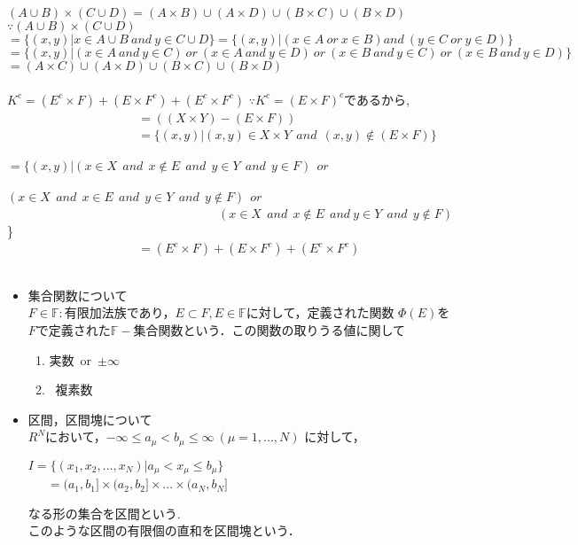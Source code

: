 \documentclass[11pt, a4paper, dvipdfmx]{jsarticle}
\theoremstyle{definition}
\begin{document}
\Lemma $(A \cup B) \times (C \cup D) = (A \times B)\cup(A \times D)\cup(B \times C)\cup(B \times D)$\\
$\because (A \cup B) \times (C \cup D)$\\
$=\{(x,y)|x \in A \cup B ~and~ y \in C\cup D\} = \{(x,y)|(x\in A ~or~ x \in B) and~(y \in C ~or~ y \in D)\}$\\
$=\{(x,y)|(x \in A~ and~ y\in C) ~or~(x \in A ~and~ y\in D) ~or~(x \in B ~and~ y\in C) ~or~(x \in B ~and~ y\in D)\}$
$=(A \times C)\cup(A \times D)\cup(B \times C )\cup(B \times D)$\\
\\
\Lemma $K^{c} = (E^{c} \times  F)+(E \times F^{c})+(E^{c} \times F^{c})$
$\because K^{c} = (E \times F)^{c}$であるから,\\
~~~~~~~~~~~~~~~~~~~~~$=((X\times Y)- (E \times F))$\\
~~~~~~~~~~~~~~~~~~~~~$=\{(x,y)|(x,y) \in X \times Y~~and~~(x,y)\notin(E \times F)\}$\\
~~~~~~~~~~~~~~~~~~~~~$=\{(x,y)|(x \in X~~and~~x \notin E~~and~~y \in Y~~and~~y \in F)~~or~~$\\
~~~~~~~~~~~~~~~~~~~~~~~~~~~~~~~~~~$(x \in X~~and~~x \in E~~and~~y\in Y~~and~~y \notin F)~~or~~$\\
~~~~~~~~~~~~~~~~~~~~~~~~~~~~~~~~~~$(x \in X~~and~~x \notin E~~and~y \in Y~~and~~y \notin F)$\}\\
~~~~~~~~~~~~~~~~~~~~~$=(E^{c} \times F)+(E \times F^{c})+(E^{c} \times F^{c})$\\
\\
\begin{itemize}
  \item 集合関数について\\
  $F \in \mathbb{F}:$有限加法族であり，$E \subset F,E \in \mathbb{F}$に対して，定義された関数
  $\Phi(E)$を$F$で定義された$\mathbb{F}-$集合関数という．この関数の取りうる値に関して
  \begin{enumerate}
\renewcommand{\labelenumi}{(\roman{enumi})}
\item 実数~or~$\pm \infty$
\item 複素数
　\end{enumerate}
\item 区間，区間塊について\\
$R^{N}$において，$-\infty \leq a_{\mu} < b_{\mu} \leq \infty~(\mu = 1,...,N)$
に対して，\\
\begin{center}
 $I = \{(x_1,x_2,...,x_{N})|a_{\mu}<x_{\mu}\le b_{\mu}\}$\\
 ~~~$=(a_1,b_1]\times(a_2,b_2]\times...\times(a_{N},b_{N}]$
\end{center}
なる形の集合を区間という.\\
このような区間の有限個の直和を区間塊という．
\end{itemize}
\end{document}
